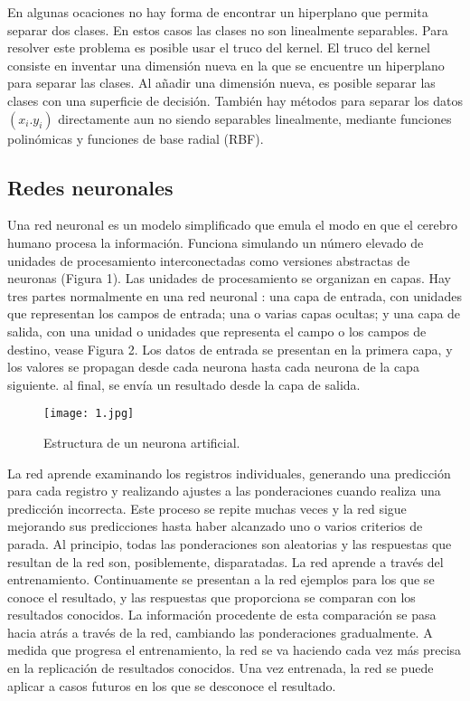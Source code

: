 \documentclass[conference]{IEEEtran}
\begin{document}
En algunas ocaciones no hay forma de encontrar un hiperplano que permita separar dos clases. En estos casos las clases no son linealmente separables. Para resolver este problema es posible usar el truco del kernel. El truco del kernel consiste en inventar una dimensión nueva en la que se encuentre un hiperplano para separar las clases. Al añadir una dimensión nueva, es posible separar las clases con una superficie de decisión. También hay métodos para separar los datos $(x_i. y_i)$ directamente aun no siendo separables linealmente, mediante funciones polinómicas y funciones de base radial (RBF).

\subsection{Redes neuronales}
Una red neuronal es un modelo simplificado que emula el modo en que el cerebro humano procesa la información. Funciona simulando un número elevado de unidades de procesamiento interconectadas como versiones abstractas de neuronas (Figura 1). Las unidades de procesamiento se organizan en capas. Hay tres partes normalmente en una red neuronal : una capa de entrada, con unidades que representan los campos de entrada; una o varias capas ocultas; y una capa de salida, con una unidad o unidades que representa el campo o los campos de destino, vease Figura 2. Los datos de entrada se presentan en la primera capa, y los valores se propagan desde cada neurona hasta cada neurona de la capa siguiente. al final, se envía un resultado desde la capa de salida.

\begin{figure}[h]
    \centering
    \texttt{[image: 1.jpg]}
    \caption{Estructura de un neurona artificial.}
    \label{fig:mesh1}
\end{figure}

La red aprende examinando los registros individuales, generando una predicción para cada registro y realizando ajustes a las ponderaciones cuando realiza una predicción incorrecta. Este proceso se repite muchas veces y la red sigue mejorando sus predicciones hasta haber alcanzado uno o varios criterios de parada. Al principio, todas las ponderaciones son aleatorias y las respuestas que resultan de la red son, posiblemente, disparatadas. La red aprende a través del entrenamiento. Continuamente se presentan a la red ejemplos para los que se conoce el resultado, y las respuestas que proporciona se comparan con los resultados conocidos. La información procedente de esta comparación se pasa hacia atrás a través de la red, cambiando las ponderaciones gradualmente. A medida que progresa el entrenamiento, la red se va haciendo cada vez más precisa en la replicación de resultados conocidos. Una vez entrenada, la red se puede aplicar a casos futuros en los que se desconoce el resultado.
\end{document}
